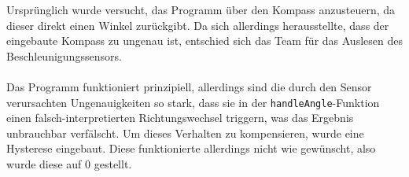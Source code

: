 Ursprünglich wurde versucht, das Programm über den Kompass anzusteuern, da dieser direkt einen Winkel zurückgibt. Da sich allerdings herausstellte, dass der eingebaute Kompass zu ungenau ist, entschied sich das Team für das Auslesen des Beschleunigungssensors.\\
\\
Das Programm funktioniert prinzipiell, allerdings sind die durch den Sensor verursachten Ungenauigkeiten so stark, dass sie in der \texttt{handleAngle}-Funktion einen falsch-interpretierten Richtungswechsel triggern, was das Ergebnis unbrauchbar verfälscht. Um dieses Verhalten zu kompensieren, wurde eine Hysterese eingebaut. Diese funktionierte allerdings nicht wie gewünscht, also wurde diese auf 0 gestellt.